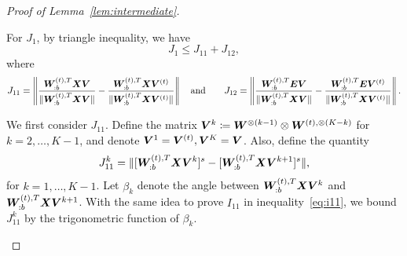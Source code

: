 \documentclass[lettersize,onecolumn,journal]{IEEEtran}
\theoremstyle{definition}
\theoremstyle{definition}
\begin{document}
\begin{proof}[Proof of Lemma~\ref{lem:intermediate}]
\begin{enumerate}[wide]
    For $J_1$, by triangle inequality,
we have 
    \begin{equation}
        J_1 \leq J_{11} + J_{12},
    \end{equation}
    where 
    \begin{equation}
        J_{11} =  \left\lVert \frac{\bm{W}_{:b}^{(t),T} \bm X \bm{V} }{\lVert \bm{W}_{:b}^{(t),T} \bm X \bm{V} \rVert} - \frac{\bm{W}_{:b}^{(t),T} \bm X \bm{V}^{(t)} }{\lVert \bm{W}_{:b}^{(t),T} \bm X \bm{V}^{(t)} \rVert}  \right\rVert \quad \text{and} \quad \quad J_{12} =  \left\lVert \frac{\bm{W}_{:b}^{(t),T}  \bm{E} \bm{V}}{ \lVert\bm{W}_{:b}^{(t),T}  \bm X \bm{V}\rVert } - \frac{\bm{W}_{:b}^{(t),T}  \bm{E} \bm{V}^{(t)}}{ \lVert\bm{W}_{:b}^{(t),T}  \bm X \bm{V}^{(t)}\rVert }   \right\rVert.
    \end{equation}
    
    
    We first consider $J_{11}$.  Define the matrix $\bm{V}^{k} \coloneqq \bm{W}^{\otimes (k-1)} \otimes \bm{W}^{(t), \otimes (K-k)}$ for $k = 2,\ldots, K-1$, and denote $\bm{V}^1 = \bm{V}^{(t)}, \bm{V}^K = \bm{V}$. Also, define the quantity
    \begin{equation}
        J_{11}^k = \lVert [\bm{W}_{:b}^{(t),T} \bm X \bm{V}^k ]^s - [\bm{W}_{:b}^{(t),T} \bm X \bm{V}^{k+1} ]^s \rVert,
     \end{equation}
    for $k = 1,\ldots, K-1$. Let $\beta_k$ denote the angle between $\bm{W}_{:b}^{(t),T} \bm X \bm{V}^k$ and $\bm{W}_{:b}^{(t),T} \bm X \bm{V}^{k+1}$. With the same idea to prove $I_{11}$ in inequality~\eqref{eq:i11}, we bound $J_{11}^k$ by the trigonometric function of $\beta_k$. 
    

\end{enumerate}
\end{proof}
\end{document}
